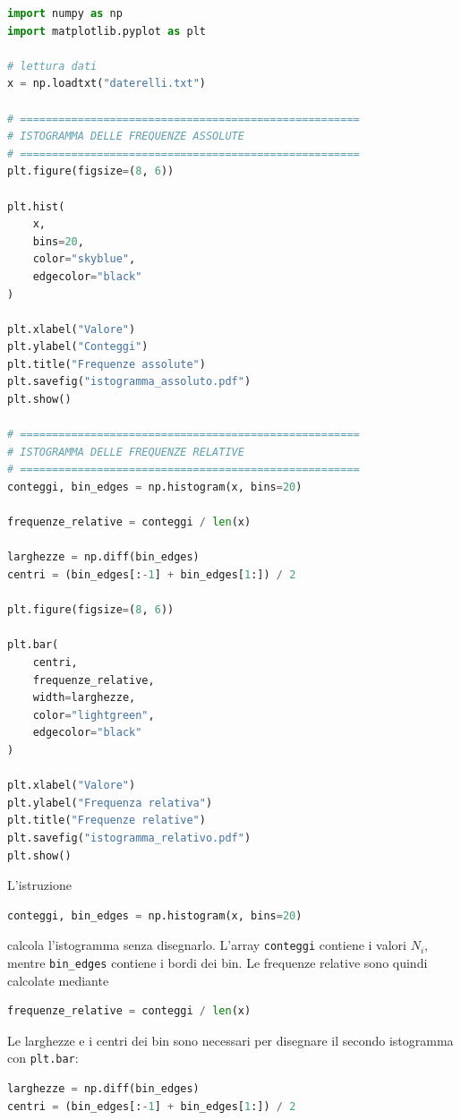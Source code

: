 \documentclass[11pt,a4paper]{book}
\begin{document}
\begin{lstlisting}[language=Python]
import numpy as np
import matplotlib.pyplot as plt

# lettura dati
x = np.loadtxt("daterelli.txt")

# =====================================================
# ISTOGRAMMA DELLE FREQUENZE ASSOLUTE
# =====================================================
plt.figure(figsize=(8, 6))

plt.hist(
    x,
    bins=20,
    color="skyblue",
    edgecolor="black"
)

plt.xlabel("Valore")
plt.ylabel("Conteggi")
plt.title("Frequenze assolute")
plt.savefig("istogramma_assoluto.pdf")
plt.show()

# =====================================================
# ISTOGRAMMA DELLE FREQUENZE RELATIVE
# =====================================================
conteggi, bin_edges = np.histogram(x, bins=20)

frequenze_relative = conteggi / len(x)

larghezze = np.diff(bin_edges)
centri = (bin_edges[:-1] + bin_edges[1:]) / 2

plt.figure(figsize=(8, 6))

plt.bar(
    centri,
    frequenze_relative,
    width=larghezze,
    color="lightgreen",
    edgecolor="black"
)

plt.xlabel("Valore")
plt.ylabel("Frequenza relativa")
plt.title("Frequenze relative")
plt.savefig("istogramma_relativo.pdf")
plt.show()
\end{lstlisting}

L'istruzione

\begin{lstlisting}[language=Python]
conteggi, bin_edges = np.histogram(x, bins=20)
\end{lstlisting}

calcola l'istogramma senza disegnarlo. L'array \texttt{conteggi}
contiene i valori $N_i$, mentre \texttt{bin\_edges} contiene i bordi
dei bin. Le frequenze relative sono quindi calcolate mediante

\begin{lstlisting}[language=Python]
frequenze_relative = conteggi / len(x)
\end{lstlisting}

Le larghezze e i centri dei bin sono necessari per disegnare il secondo
istogramma con \texttt{plt.bar}:

\begin{lstlisting}[language=Python]
larghezze = np.diff(bin_edges)
centri = (bin_edges[:-1] + bin_edges[1:]) / 2
\end{lstlisting}
\end{document}
